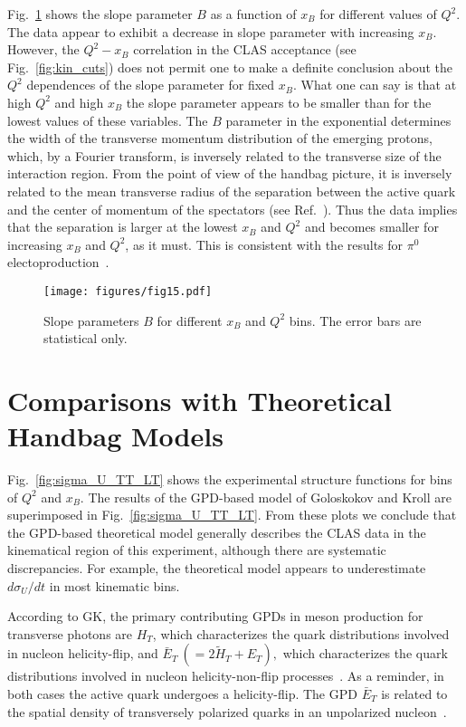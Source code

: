 \documentclass[prc,aps,floatfix,showpacs,showkeys,twocolumn,superscriptaddress,letterpaper,10pt]{revtex4-1}
\begin{document}
Fig.~\ref{fig:t-dep} shows the slope parameter $B$ as a function of $x_B$ for different values of $Q^2$. 
The data appear to exhibit a decrease in slope parameter  with increasing $x_B$. However, the $Q^2-x_B$ correlation in the CLAS acceptance (see Fig.~\ref{fig:kin_cuts}) does not permit one to make a definite conclusion about the  $Q^2$ dependences of the slope parameter for fixed $x_B$. What one can say is that at high $Q^2$ and high $x_B$   the slope parameter appears to be smaller than for the lowest values of these variables.  
The $B$ parameter in the exponential determines the  width of the transverse momentum distribution of the emerging protons, which, by  a Fourier  transform, is inversely related to the transverse size of the interaction region.  From the point of view of the handbag picture, it is inversely related to  the  mean  transverse radius of the separation  between the active quark and the center of momentum of the spectators 
(see Ref.~\cite{Burkardt:2007sc}).  Thus the data implies that the separation is  larger at the lowest $x_B$ and $Q^2$ and becomes smaller for increasing $x_B$ and $Q^2$, as it must.  This is consistent with the results for $\pi^0$ electoproduction~\cite{Bedlinskiy:2014tvi}.

\begin{figure}
\texttt{[image: figures/fig15.pdf]}
\caption{Slope parameters $B$ for different $x_B$ and $Q^2$ bins.
The error bars are statistical only.}		
\label{fig:t-dep}
\end{figure} 


\section{Comparisons with Theoretical Handbag Models}

Fig.~\ref{fig:sigma_U_TT_LT} shows the experimental structure functions  for  bins of $Q^2$ and $x_B$.
The results of the GPD-based model of Goloskokov and Kroll \cite{Goloskokov:2011rd}  are  superimposed in Fig.~\ref{fig:sigma_U_TT_LT}. 
From these plots we  conclude that the GPD-based theoretical model generally describes the CLAS data in the kinematical region of this experiment, although there are systematic discrepancies. For example, the theoretical model appears to underestimate  $d\sigma_U/dt$ in most kinematic bins. 

According to GK,  
the primary contributing GPDs in meson production for transverse photons are  $H_T$, which characterizes the quark distributions involved in nucleon helicity-flip, and   $\bar E_T \ ( = 2\widetilde H_T + E_T), $ which characterizes the quark distributions  involved in  nucleon  helicity-non-flip 
processes~\cite{Diehl:2005jf, Gockeler:2006zu}. 
As a reminder, in both cases the active quark undergoes a helicity-flip. 
 The GPD $\bar E_T$  is related to the spatial density  of transversely  polarized quarks in an unpolarized nucleon~\cite{Gockeler:2006zu}.
\end{document}
